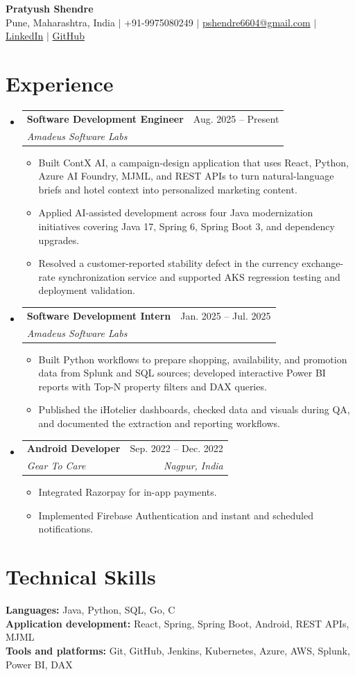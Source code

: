 \documentclass[a4paper,11pt]{article}
\makeatletter
\newcommand{\entry}[4]{\item\begin{tabularx}{\textwidth}{@{}Xr@{}}\textbf{#1}& #2\\\textit{\small #3}&\textit{\small #4}\end{tabularx}\vspace{-5pt}}
\newcommand{\bulletpoint}[1]{\item\small{#1}}
\makeatother
\begin{document}
\begin{center}
  {\Large\bfseries Pratyush Shendre}\\[2pt]
  \small Pune, Maharashtra, India $|$ +91-9975080249 $|$
  \href{mailto:pshendre6604@gmail.com}{pshendre6604@gmail.com} $|$
  \href{https://linkedin.com/in/pratyush-shendre-2256a7223/}{LinkedIn} $|$
  \href{https://github.com/PratyushS04}{GitHub}
\end{center}

\section{Experience}
\begin{itemize}[leftmargin=0in,label={}]
  \entry{Software Development Engineer}{Aug. 2025 -- Present}{Amadeus Software Labs}{}
  \begin{itemize}
    \bulletpoint{Built ContX AI, a campaign-design application that uses React, Python, Azure AI Foundry, MJML, and REST APIs to turn natural-language briefs and hotel context into personalized marketing content.}
    \bulletpoint{Applied AI-assisted development across four Java modernization initiatives covering Java 17, Spring 6, Spring Boot 3, and dependency upgrades.}
    \bulletpoint{Resolved a customer-reported stability defect in the currency exchange-rate synchronization service and supported AKS regression testing and deployment validation.}
  \end{itemize}
  \entry{Software Development Intern}{Jan. 2025 -- Jul. 2025}{Amadeus Software Labs}{}
  \begin{itemize}
    \bulletpoint{Built Python workf{}lows to prepare shopping, availability, and promotion data from Splunk and SQL sources; developed interactive Power BI reports with Top-N property f{}ilters and DAX queries.}
    \bulletpoint{Published the iHotelier dashboards, checked data and visuals during QA, and documented the extraction and reporting workf{}lows.}
  \end{itemize}
  \entry{Android Developer}{Sep. 2022 -- Dec. 2022}{Gear To Care}{Nagpur, India}
  \begin{itemize}
    \bulletpoint{Integrated Razorpay for in-app payments.}
    \bulletpoint{Implemented Firebase Authentication and instant and scheduled notif{}ications.}
  \end{itemize}
\end{itemize}

\section{Technical Skills}
\small\textbf{Languages:} Java, Python, SQL, Go, C \\
\textbf{Application development:} React, Spring, Spring Boot, Android, REST APIs, MJML \\
\textbf{Tools and platforms:} Git, GitHub, Jenkins, Kubernetes, Azure, AWS, Splunk, Power BI, DAX
\end{document}
